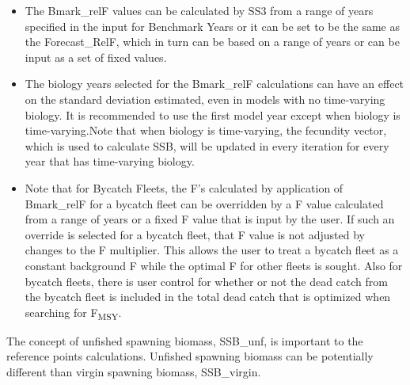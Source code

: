 \begin{itemize}
	\item The Bmark\_relF values can be calculated by SS3 from a range of years specified in the input for Benchmark Years or it can be set to be the same as the Forecast\_RelF, which in turn can be based on a range of years or can be input as a set of fixed values.
	
	\item The biology years selected for the Bmark\_relF calculations can have an effect on the standard deviation estimated, even in models with no time-varying biology. It is recommended to use the first model year except when biology is time-varying.Note that when biology is time-varying, the fecundity vector, which is used to calculate SSB, will be updated in every iteration for every year that has time-varying biology.  
	
	\item Note that for Bycatch Fleets, the F's calculated by application of Bmark\_relF for a bycatch fleet can be overridden by a F value calculated from a range of years or a fixed F value that is input by the user.  If such an override is selected for a bycatch fleet, that F value is not adjusted by changes to the F multiplier.  This allows the user to treat a bycatch fleet as a constant background F while the optimal F for other fleets is sought.  Also for bycatch fleets, there is user control for whether or not the dead catch from the bycatch fleet is included in the total dead catch that is optimized when searching for F\textsubscript{MSY}.
\end{itemize}

The concept of unfished spawning biomass, SSB\_unf, is important to the reference points calculations.  Unfished spawning biomass can be potentially different than virgin spawning biomass, SSB\_virgin.
  

